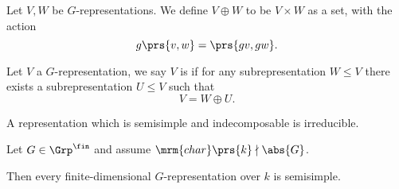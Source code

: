 \documentclass[10pt,a4paper,twoside,openany,hidelinks]{book}
\begin{document}
\begin{definition}
Let $V,W$ be $G$-representations.
We define $V \oplus W$ to be $V \times W$ as a set, with the action
\[g \prs{v,w} = \prs{gv, gw} \text{.}\]
\end{definition}

\begin{definition}
Let $V$ a $G$-representation, we say $V$ is  if for any subrepresentation $W \leq V$ there exists a subrepresentation $U \leq V$ such that
\[V = W \oplus U \text{.}\]
\end{definition}

\begin{remark}
A representation which is semisimple and indecomposable is irreducible.
\end{remark}

\begin{theorem}[Maschke] \label{theorem:maschke}
Let $G \in \Grp^\fin$ and assume $\mrm{char}\prs{k} \nmid \abs{G}$.

Then every finite-dimensional $G$-representation over $k$ is semisimple.
\end{theorem}
\end{document}

